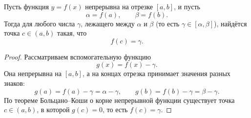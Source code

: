 \begin{theorem}
Пусть функция \(y=f(x)\) непрерывна на отрезке \([a,b]\), и пусть
\[
\alpha=f(a),\qquad \beta=f(b).
\]
Тогда для любого числа \(\gamma\), лежащего между \(\alpha\) и \(\beta\)
(то есть \(\gamma\in[\alpha,\beta]\)), найдётся точка \(c\in(a,b)\) такая, что
\[
f(c)=\gamma.
\]
\end{theorem}

\begin{proof}
Рассматриваем вспомогательную функцию
\[
g(x)=f(x)-\gamma.
\]
Она непрерывна на \([a,b]\), а на концах отрезка принимает значения разных знаков:
\[
g(a)=f(a)-\gamma=\alpha-\gamma,\qquad
g(b)=f(b)-\gamma=\beta-\gamma.
\]
По теореме Больцано--Коши о корне непрерывной функции существует точка
\(c\in(a,b)\), в которой \(g(c)=0\), то есть \(f(c)=\gamma\).
\end{proof}